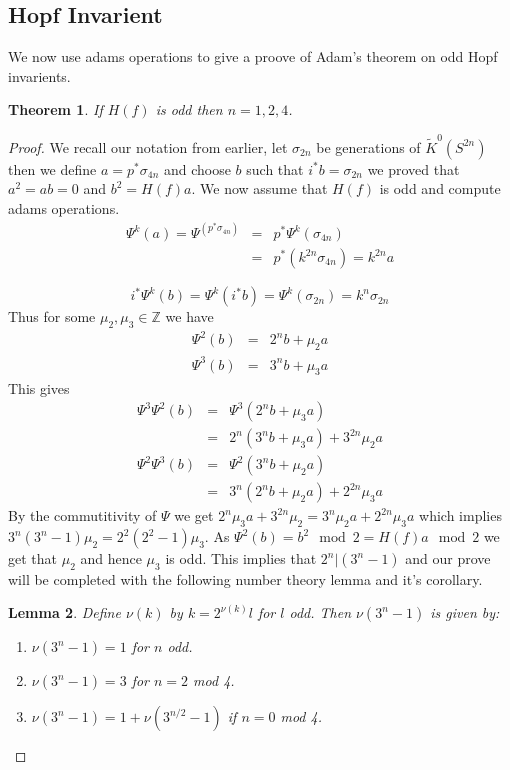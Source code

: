 \documentclass[a4paper,10pt]{article}
\theoremstyle{plain}%
\newtheorem{thm}{Theorem}
\newtheorem{lem}[thm]{Lemma}
\theoremstyle{definition}
\theoremstyle{remark}
\newcommand{\ZZ}{\mathbb{Z}}
\newcommand{\KR}{\widetilde{K}}   %
\begin{document}
\subsection{Hopf Invarient}

We now use adams operations to give a proove of Adam's theorem on odd Hopf
invarients.

\begin{thm}
  If $H(f)$ is odd then $n=1,2,4$.
\end{thm}

\begin{proof}
  We recall our notation from earlier, let $\sigma_{2n}$ be generations of
  $\KR^0(S^{2n})$ then we define $a=p^*\sigma_{4n}$ and choose $b$ such that
  $i^*b=\sigma_{2n}$ we proved that $a^2=a b=0$ and $b^2=H(f)a$. We now assume
  that $H(f)$ is odd and compute adams operations.
  \begin{align*}
    \Psi^k(a)=\Psi^(p^*\sigma_{4n})&=&p^*\Psi^k(\sigma_{4n})\\
    &=&p^*(k^{2n}\sigma_{4n})=k^{2n}a
  \end{align*}

$$ i^*\Psi^k(b)=\Psi^k(i^*b)=\Psi^k(\sigma_{2n})=k^n\sigma_{2n}$$
Thus for some $\mu_2,\mu_3\in\ZZ$ we have
\begin{align*}
  \Psi^2(b)&=&2^nb+\mu_2a\\
  \Psi^3(b)&=&3^nb+\mu_3a
\end{align*}
This gives
\begin{align*}
  \Psi^3\Psi^2(b)&=&\Psi^3(2^nb+\mu_3a)\\
  &=&2^n(3^nb+\mu_3a)+3^{2n}\mu_2a\\
  \Psi^2\Psi^3(b)&=&\Psi^2(3^nb+\mu_2a)\\
  &=&3^n(2^nb+\mu_2a)+2^{2n}\mu_3a
\end{align*}
By the commutitivity of $\Psi$ we get
$2^n\mu_3a+3^{2n}\mu_2=3^n\mu_2a+2^{2n}\mu_3a$ which implies
$3^n(3^n-1)\mu_2=2^2(2^2-1)\mu_3$. As $\Psi^2(b)=b^2 \mod 2 = H(f)a \mod 2$ we
get that $\mu_2$ and hence $\mu_3$ is odd. This implies that $2^n|(3^n-1)$ and
our prove will be completed with the following number theory lemma and it's corollary.

\begin{lem}
  Define $\nu(k)$ by $k=2^{\nu(k)}l$ for $l$ odd. Then $\nu(3^n-1)$ is given
  by:

  \begin{enumerate}
  \item $\nu(3^n-1)=1$ for $n$ odd.
  \item $\nu(3^n-1)=3$ for $n=2$ mod 4.
  \item $\nu(3^n-1)=1+\nu(3^{n/2}-1)$ if $n=0$ mod 4.
  \end{enumerate}
\end{lem}


\end{proof}
\end{document}
